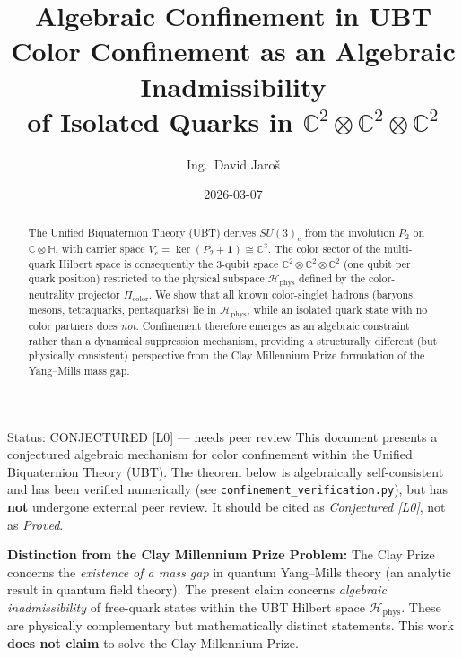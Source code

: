 \documentclass[12pt,a4paper]{article}
\newcommand{\Hphys}{\mathcal{H}_{\mathrm{phys}}}
\newcommand{\Picolor}{\Pi_{\mathrm{color}}}
\newcommand{\CCC}{\mathbb{C}}
\newcommand{\HH}{\mathbb{H}}
\begin{document}
\title{\textbf{Algebraic Confinement in UBT}\\[0.4em]
  \large Color Confinement as an Algebraic Inadmissibility\\
  of Isolated Quarks in $\CCC^2 \otimes \CCC^2 \otimes \CCC^2$}
\author{Ing.\ David Jaroš}
\date{2026-03-07}
\maketitle

\begin{statusbox}{Status: CONJECTURED [L0] — needs peer review}
This document presents a conjectured algebraic mechanism for color confinement
within the Unified Biquaternion Theory (UBT). The theorem below is algebraically
self-consistent and has been verified numerically
(see \texttt{confinement\_verification.py}), but has \textbf{not} undergone
external peer review. It should be cited as \emph{Conjectured [L0]}, not as
\emph{Proved}.

\medskip
\noindent\textbf{Distinction from the Clay Millennium Prize Problem:}
The Clay Prize concerns the \emph{existence of a mass gap} in quantum Yang--Mills
theory (an analytic result in quantum field theory). The present claim concerns
\emph{algebraic inadmissibility} of free-quark states within the UBT Hilbert space
$\Hphys$. These are physically complementary but mathematically distinct
statements. This work \textbf{does not claim} to solve the Clay Millennium Prize.
\end{statusbox}

\begin{abstract}
The Unified Biquaternion Theory (UBT) derives $SU(3)_c$ from the involution $P_2$
on $\CCC \otimes \HH$, with carrier space $V_c = \ker(P_2 + \mathbf{1}) \cong \CCC^3$.
The color sector of the multi-quark Hilbert space is consequently the 3-qubit space
$\CCC^2 \otimes \CCC^2 \otimes \CCC^2$ (one qubit per quark position) restricted
to the physical subspace $\Hphys$ defined by the color-neutrality projector
$\Picolor$.  We show that all known color-singlet hadrons (baryons, mesons,
tetraquarks, pentaquarks) lie in $\Hphys$, while an isolated quark state with no
color partners does \emph{not}.  Confinement therefore emerges as an algebraic
constraint rather than a dynamical suppression mechanism, providing a structurally
different (but physically consistent) perspective from the Clay Millennium Prize
formulation of the Yang--Mills mass gap.
\end{abstract}
\end{document}
